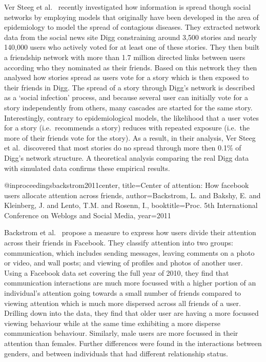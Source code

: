 Ver Steeg et al.~\cite{ver2011stops} recently investigated how
information is spread though social networks by employing models that
originally have been developed in the area of epidemiology to model
the spread of contagious diseases. They extracted network data from
the social news site Digg constraining around 3,500 stories and nearly
140,000 users who actively voted for at least one of these stories.
They then built a friendship network with more than 1.7 million
directed links between users according who they nominated as their
friends. Based on this network they then analysed how stories spread
as users vote for a story which is then exposed to their friends in
Digg. The spread of a story through Digg's network is described as a
`social infection' process, and because several user can initially
vote for a  story independently from others, many cascades are started
for the same story. Interestingly, contrary to epidemiological models,
the likelihood that a user votes for a story (i.e.\ recommends a
story) reduces with repeated exposure (i.e.\ the more of their friends
vote for the story). As a result, in their analysis, Ver Steeg et
al.\ discovered that most stories do no spread through more then 0.1\%
of Digg's network structure. A theoretical analysis comparing the real
Digg data with simulated data confirms these empirical results.



@inproceedings{backstrom2011center,
  title={Center of attention: How facebook users allocate attention across friends},
  author={Backstrom, L. and Bakshy, E. and Kleinberg, J. and Lento, T.M. and Rosenn, I.},
  booktitle={Proc. 5th International Conference on Weblogs and Social Media},
  year={2011}
}

Backstrom et al.~\cite{backstrom2011center} propose a measure to
express how users divide their attention across their friends in
Facebook. They classify attention into two groups: communication,
which includes sending messages, leaving comments on a photo or video,
and wall posts; and viewing of profiles and photos of another user.
Using a Facebook data set covering the full year of 2010, they find
that communication interactions are much more focussed with a
higher portion of an individual's attention going towards a small
number of friends compared to viewing attention which is much more
dispersed across all friends of a user. Drilling down into the data,
they find that older user are having a more focussed viewing behaviour
while at the same time exhibiting a more disperse communication
behaviour. Similarly, male users are more focussed in their
attention than females. Further differences were found in the
interactions between genders, and between individuals that had
different relationship status.




